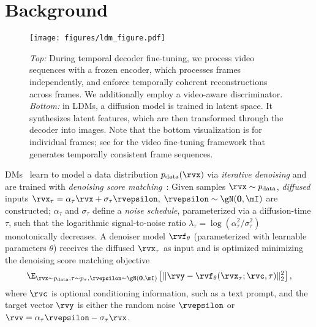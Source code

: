 \section{Background}\label{sec:background}
\vspace{-1mm}
\begin{figure}[t!]
  \vspace{-0.2cm}
    \texttt{[image: figures/ldm\_figure.pdf]}
    \caption{\small \textit{Top:} During temporal decoder fine-tuning, we process video sequences with a frozen encoder, which processes frames independently, and enforce temporally coherent reconstructions across frames. We additionally employ a video-aware discriminator. \textit{Bottom:} in LDMs, a diffusion model is trained in latent space. It synthesizes latent features, which are then transformed through the decoder into images. Note that the bottom visualization is for individual frames; see  for the video fine-tuning framework that generates temporally consistent frame sequences.} 
    \label{fig:ldm_figure}
  \vspace{-4mm}
\end{figure}DMs~\cite{sohl2015deep,ho2020ddpm,song2020score} learn to model a data distribution $p_{\text{data}}(\rvx)$ via \emph{iterative denoising} and are trained with \textit{denoising score matching}~\cite{hyvarinen2005scorematching,lyu2009scorematching,vincent2011,sohl2015deep,song2019generative,ho2020ddpm,song2020score}: Given samples $\rvx \sim p_{\text{data}}$, \emph{diffused} inputs $\rvx_\tau = \alpha_\tau \rvx + \sigma_\tau \rvepsilon, \; \rvepsilon \sim \gN(\mathbf{0}, \mI)$ are constructed; $\alpha_{\tau}$ and $\sigma_\tau$ define a \emph{noise schedule}, parameterized via 
a diffusion-time $\tau$, such that the logarithmic signal-to-noise ratio $\lambda_\tau = \log(\alpha_{\tau}^2/\sigma_\tau^2)$ monotonically decreases. A denoiser model $\rvf_\theta$ (parameterized with learnable parameters $\theta$) receives the diffused $\rvx_\tau$ as input and is
optimized minimizing the denoising score matching objective
\begin{align}
\E_{\rvx \sim p_{\text{data}}, \tau \sim p_{\tau}, \rvepsilon \sim \gN(\mathbf{0}, \mI)} \left[\Vert \rvy - \rvf_\theta(\rvx_\tau; \rvc, \tau) \Vert_2^2 \right],
\label{eq:diffusionobjective}
\end{align}
where $\rvc$ is optional conditioning information, such as a text prompt, and the target vector $\rvy$ is either the random noise $\rvepsilon$ or $\rvv = \alpha_\tau \rvepsilon - \sigma_\tau \rvx$.
